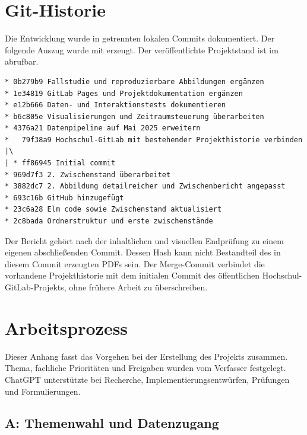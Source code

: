 \section{Git-Historie}
\label{app:git}

Die Entwicklung wurde in getrennten lokalen Commits dokumentiert. Der folgende
Auszug wurde mit  erzeugt. Der
veröffentlichte Projektstand ist im 
abrufbar.

\begin{lstlisting}[language={}]
* 0b279b9 Fallstudie und reproduzierbare Abbildungen ergänzen
* 1e34819 GitLab Pages und Projektdokumentation ergänzen
* e12b666 Daten- und Interaktionstests dokumentieren
* b6c805e Visualisierungen und Zeitraumsteuerung überarbeiten
* 4376a21 Datenpipeline auf Mai 2025 erweitern
*   79f38a9 Hochschul-GitLab mit bestehender Projekthistorie verbinden
|\
| * ff86945 Initial commit
* 969d7f3 2. Zwischenstand überarbeitet
* 3882dc7 2. Abbildung detailreicher und Zwischenbericht angepasst
* 693c16b GitHub hinzugefügt
* 23c6a28 Elm code sowie Zwischenstand aktualisiert
* 2c8bada Ordnerstruktur und erste zwischenstände
\end{lstlisting}

Der Bericht gehört nach der inhaltlichen und visuellen Endprüfung zu einem
eigenen abschlie{\ss}enden Commit. Dessen Hash kann nicht Bestandteil des in
diesem Commit erzeugten PDFs sein. Der Merge-Commit \code{79f38a9} verbindet
die vorhandene Projekthistorie mit dem initialen Commit des öffentlichen
Hochschul-GitLab-Projekts, ohne frühere Arbeit zu überschreiben.

\section{Arbeitsprozess}
\label{app:ki}

Dieser Anhang fasst das Vorgehen bei der Erstellung des Projekts zusammen.
Thema, fachliche Prioritäten und Freigaben wurden vom Verfasser festgelegt.
ChatGPT unterstützte bei Recherche, Implementierungsentwürfen, Prüfungen
und Formulierungen.

\subsection*{A: Themenwahl und Datenzugang}

